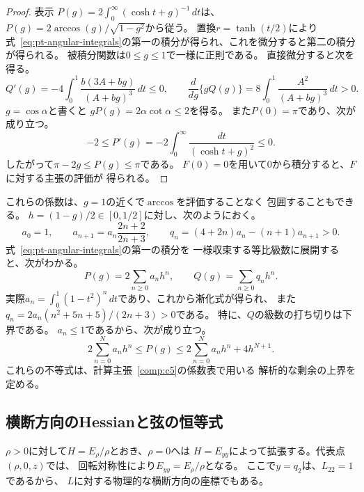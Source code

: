 \begin{proof}
表示
$P(g)=2\int_0^\infty(\cosh t+g)^{-1}\,dt$は、
$P(g)=2\arccos(g)/\sqrt{1-g^2}$から従う。
置換$r=\tanh(t/2)$により
式~\eqref{eq:pt-angular-integrals}の第一の積分が得られ、これを微分すると第二の積分が得られる。
被積分関数は$0\leq g\leq1$で一様に正則である。
直接微分すると次を得る。
\[
 Q'(g)=-4\int_0^1\frac{b(3A+bg)}{(A+bg)^3}\,dt\leq0,
 \qquad
 \frac{d}{dg}\{gQ(g)\}
 =8\int_0^1\frac{A^2}{(A+bg)^3}\,dt>0 .
\]
$g=\cos\alpha$と書くと
$gP(g)=2\alpha\cot\alpha\leq2$を得る。
また$P(0)=\pi$であり、次が成り立つ。
\[
 -2\leq P'(g)
 =-2\int_0^\infty\frac{dt}{(\cosh t+g)^2}\leq0.
\]
したがって$\pi-2g\leq P(g)\leq\pi$である。
$F(0)=0$を用いて$0$から積分すると、$F$に対する主張の評価が
得られる。
\end{proof}

これらの係数は、$g=1$の近くで$\arccos$を評価することなく
包囲することもできる。
$h=(1-g)/2\in[0,1/2]$に対し、次のようにおく。
\begin{equation}
 a_0=1,\qquad
 a_{n+1}=a_n\frac{2n+2}{2n+3},\qquad
 q_n=(4+2n)a_n-(n+1)a_{n+1}>0 .
\label{eq:pt-positive-series-coefficients}
\end{equation}
式~\eqref{eq:pt-angular-integrals}の第一の積分を
一様収束する等比級数に展開すると、次がわかる。
\begin{equation}
 P(g)=2\sum_{n\geq0}a_nh^n,\qquad
 Q(g)=\sum_{n\geq0}q_nh^n .
\label{eq:pt-positive-series}
\end{equation}
実際$a_n=\int_0^1(1-t^2)^n\,dt$であり、これから漸化式が得られ、
また
$q_n=2a_n(n^2+5n+5)/(2n+3)>0$である。
特に、$Q$の級数の打ち切りは下界である。
$a_n\leq1$であるから、次が成り立つ。
\begin{equation}
 2\sum_{n=0}^N a_nh^n
 \leq P(g)
 \leq 2\sum_{n=0}^N a_nh^n+4h^{N+1}.
\label{eq:pt-series-enclosures}
\end{equation}
これらの不等式は、計算主張~\ref{comp:c5}の係数表で用いる
解析的な剰余の上界を定める。

\subsection{横断方向のHessianと弦の恒等式}
\label{subsec:pt-chord}

$\rho>0$に対して$H=E_\rho/\rho$とおき、$\rho=0$へは
$H=E_{yy}$によって拡張する。代表点$(\rho,0,z)$では、
回転対称性により$E_{yy}=E_\rho/\rho$となる。
ここで$y=q_2$は、$L_{22}=1$であるから、
$L$に対する物理的な横断方向の座標でもある。

